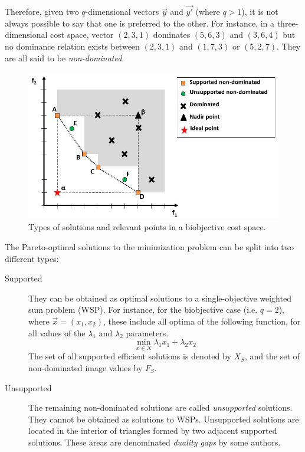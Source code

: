 Therefore, given two $q$-dimensional vectors $\vec y$ and $\vec{y'}$ (where $q > 1$), it is not always possible to say that one is preferred to the other. For instance, in a three-dimensional cost space, vector $(2,3,1)$ dominates $(5,6,3)$ and $(3,6,4)$ but no dominance relation exists between $(2,3,1)$ and $(1,7,3)$ or $(5,2,7)$. They are all said to be \emph{non-dominated}. 

\begin{figure}
\centering
\includegraphics[width=1\textwidth]{Images/Chapter2/MOP-solutions}
\caption{Types of solutions and relevant points in a biobjective cost space.}
\label{fig:2-1}
\end{figure}

The Pareto-optimal solutions to the minimization problem can be split into two different types:
\begin{description}
    \item[Supported] They can be obtained as optimal solutions to a single-objective weighted sum problem (WSP). For instance, for the biobjective case (i.e. $q=2$), where $\vec x=(x_1,x_2)$, these include all optima of the following function, for all values of the $\lambda_1$ and $\lambda_2$ parameters.
\begin{equation}\label{chapMultiObjAlg:eq:wsp}
    \min_{x\in X} \lambda_1 x_1 + \lambda_2 x_2
\end{equation}
The set of all supported efficient solutions is denoted by $X_{S}$, and the set of non-dominated image values by $F_{S}$. 
    \item[Unsupported] The remaining non-dominated solutions are called \textit{unsupported} solutions. They cannot be obtained as solutions to WSPs. Unsupported solutions are located in the interior of triangles formed by two adjacent supported solutions. These areas are denominated \textit{duality gaps} by some authors. 
\end{description}

